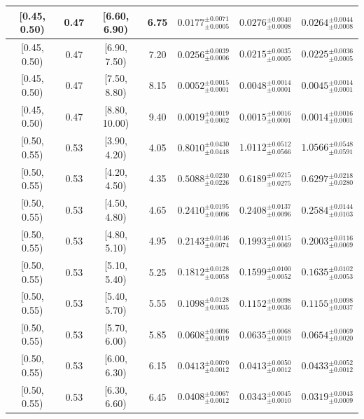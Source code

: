 \begin{longtable}{|c|c|c|c|c|c|c|}
[0.45, 0.50) & 0.47 & [6.60, 6.90) & 6.75 & $0.0177^{ \pm 0.0071 }_{ \pm 0.0005 }$ & $0.0276^{ \pm 0.0040 }_{ \pm 0.0008 }$ & $0.0264^{ \pm 0.0044 }_{ \pm 0.0008 }$ \\ 
\hline
[0.45, 0.50) & 0.47 & [6.90, 7.50) & 7.20 & $0.0256^{ \pm 0.0039 }_{ \pm 0.0006 }$ & $0.0215^{ \pm 0.0035 }_{ \pm 0.0005 }$ & $0.0225^{ \pm 0.0036 }_{ \pm 0.0005 }$ \\ 
\hline
[0.45, 0.50) & 0.47 & [7.50, 8.80) & 8.15 & $0.0052^{ \pm 0.0015 }_{ \pm 0.0001 }$ & $0.0048^{ \pm 0.0014 }_{ \pm 0.0001 }$ & $0.0045^{ \pm 0.0014 }_{ \pm 0.0001 }$ \\ 
\hline
[0.45, 0.50) & 0.47 & [8.80, 10.00) & 9.40 & $0.0019^{ \pm 0.0019 }_{ \pm 0.0002 }$ & $0.0015^{ \pm 0.0016 }_{ \pm 0.0001 }$ & $0.0014^{ \pm 0.0016 }_{ \pm 0.0001 }$ \\ 
\hline
[0.50, 0.55) & 0.53 & [3.90, 4.20) & 4.05 & $0.8010^{ \pm 0.0430 }_{ \pm 0.0448 }$ & $1.0112^{ \pm 0.0512 }_{ \pm 0.0566 }$ & $1.0566^{ \pm 0.0548 }_{ \pm 0.0591 }$ \\ 
\hline
[0.50, 0.55) & 0.53 & [4.20, 4.50) & 4.35 & $0.5088^{ \pm 0.0230 }_{ \pm 0.0226 }$ & $0.6189^{ \pm 0.0215 }_{ \pm 0.0275 }$ & $0.6297^{ \pm 0.0218 }_{ \pm 0.0280 }$ \\ 
\hline
[0.50, 0.55) & 0.53 & [4.50, 4.80) & 4.65 & $0.2410^{ \pm 0.0195 }_{ \pm 0.0096 }$ & $0.2408^{ \pm 0.0137 }_{ \pm 0.0096 }$ & $0.2584^{ \pm 0.0144 }_{ \pm 0.0103 }$ \\ 
\hline
[0.50, 0.55) & 0.53 & [4.80, 5.10) & 4.95 & $0.2143^{ \pm 0.0146 }_{ \pm 0.0074 }$ & $0.1993^{ \pm 0.0115 }_{ \pm 0.0069 }$ & $0.2003^{ \pm 0.0116 }_{ \pm 0.0069 }$ \\ 
\hline
[0.50, 0.55) & 0.53 & [5.10, 5.40) & 5.25 & $0.1812^{ \pm 0.0128 }_{ \pm 0.0058 }$ & $0.1599^{ \pm 0.0100 }_{ \pm 0.0052 }$ & $0.1635^{ \pm 0.0102 }_{ \pm 0.0053 }$ \\ 
\hline
[0.50, 0.55) & 0.53 & [5.40, 5.70) & 5.55 & $0.1098^{ \pm 0.0128 }_{ \pm 0.0035 }$ & $0.1152^{ \pm 0.0098 }_{ \pm 0.0036 }$ & $0.1155^{ \pm 0.0098 }_{ \pm 0.0037 }$ \\ 
\hline
[0.50, 0.55) & 0.53 & [5.70, 6.00) & 5.85 & $0.0608^{ \pm 0.0096 }_{ \pm 0.0019 }$ & $0.0635^{ \pm 0.0068 }_{ \pm 0.0019 }$ & $0.0654^{ \pm 0.0069 }_{ \pm 0.0020 }$ \\ 
\hline
[0.50, 0.55) & 0.53 & [6.00, 6.30) & 6.15 & $0.0413^{ \pm 0.0070 }_{ \pm 0.0012 }$ & $0.0413^{ \pm 0.0050 }_{ \pm 0.0012 }$ & $0.0433^{ \pm 0.0052 }_{ \pm 0.0012 }$ \\ 
\hline
[0.50, 0.55) & 0.53 & [6.30, 6.60) & 6.45 & $0.0408^{ \pm 0.0067 }_{ \pm 0.0012 }$ & $0.0343^{ \pm 0.0045 }_{ \pm 0.0010 }$ & $0.0319^{ \pm 0.0043 }_{ \pm 0.0009 }$ \\ 

\end{longtable}
